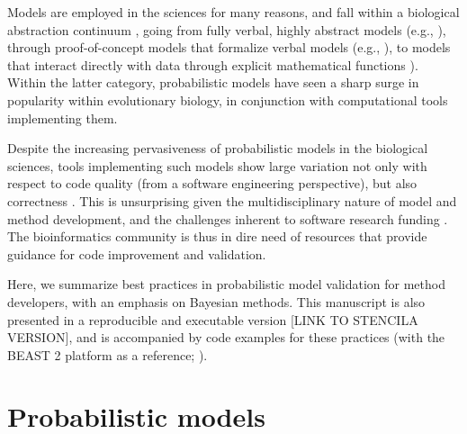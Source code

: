 \documentclass[oneside]{article}
\begin{document}
Models are employed in the sciences for many reasons, and fall within
a biological abstraction continuum \citep{servedio14}, going from
fully verbal, highly abstract models (e.g., \citealt{vanvalen73}),
through proof-of-concept models that formalize verbal models (e.g.,
\citealt{maynard78,reinhold99,mendes18}), to models that
interact directly with data through explicit mathematical
functions \citep{yule24,felsenstein73,hky,hudson90}).
Within the latter category, probabilistic models have seen a sharp surge
in popularity within evolutionary biology, in conjunction
with computational tools implementing them.

Despite the increasing pervasiveness of probabilistic models in the
biological sciences, tools implementing such models show large
variation not only with respect to code quality (from a software engineering
perspective), but also correctness \citep{darriba18}.
This is unsurprising given the multidisciplinary nature of model and method
development, and the challenges inherent to software research funding
\citep{siepel19}.
The bioinformatics community is thus in dire need of resources that
provide guidance for code improvement and validation.

Here, we summarize best practices in probabilistic model validation for method
developers, with an emphasis on Bayesian methods.
This manuscript is also presented in a reproducible and executable version
[LINK TO STENCILA VERSION], and is accompanied by code examples for these practices
(with the BEAST 2 platform as a reference; \citealp{beast25}).



\section*{Probabilistic models}
\end{document}
